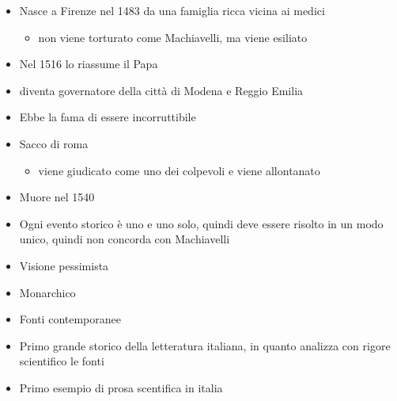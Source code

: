 \documentclass[
]{article}
\providecommand{\tightlist}{%
  \setlength{\itemsep}{0pt}\setlength{\parskip}{0pt}}
\begin{document}
\begin{itemize}
\tightlist
\item
  Nasce a Firenze nel 1483 da una famiglia ricca vicina ai medici

  \begin{itemize}
  \tightlist
  \item
    non viene torturato come Machiavelli, ma viene esiliato
  \end{itemize}
\item
  Nel 1516 lo riassume il Papa
\item
  diventa governatore della città di Modena e Reggio Emilia
\item
  Ebbe la fama di essere incorruttibile
\item
  Sacco di roma

  \begin{itemize}
  \tightlist
  \item
    viene giudicato come uno dei colpevoli e viene allontanato
  \end{itemize}
\item
  Muore nel 1540
\item
  Ogni evento storico è uno e uno solo, quindi deve essere risolto in un
  modo unico, quindi non concorda con Machiavelli
\item
  Visione pessimista
\item
  Monarchico
\item
  Fonti contemporanee
\item
  Primo grande storico della letteratura italiana, in quanto analizza
  con rigore scientifico le fonti
\item
  Primo esempio di prosa scentifica in italia
\end{itemize}
\end{document}
